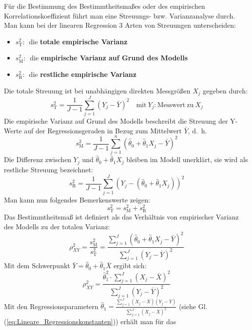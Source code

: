 F\"{u}r die Bestimmung des Bestimmtheitsma{\ss}es oder des
empirischen Korrelationskoeffizient f\"{u}hrt man eine Streuungs-
bzw. Varianzanalyse durch. Man kann bei der linearen Regression 3
Arten von Streuungen unterscheiden:
\begin{itemize}
	\item[] $s_{\mathrm{T}}^2:$~die \textbf{totale empirische Varianz}
	\item[] $s_{\mathrm{M}}^2:$~die \textbf{empirische Varianz auf Grund des Modells}
	\item[] $s_{\mathrm{R}}^2:$~die \textbf{restliche empirische Varianz}
\end{itemize}
Die totale Streuung ist bei unabhängigen direkten Messgrößen $X_j$ gegeben
durch:
\begin{equation}
s_{\mathrm{T}}^2 = \frac{1}{J - 1}\sum\limits_{j = 1}^J {(Y_j - \bar {Y})^2}
\quad \mathrm{mit~} Y_j : \mathrm{Messwert ~zu~}  X_j 
\end{equation}
Die empirische Varianz auf Grund des Modells beschreibt die
Streuung der Y-Werte auf der Regressionsgeraden in Bezug zum
Mittelwert $\bar{Y}$, d.~h.
\begin{equation}
s_{\mathrm{M}}^2 = \frac{1}{J - 1}\sum\limits_{j = 1}^n {(\hat{\theta}_0 + \hat{\theta}_1 X_j - \bar
	{Y})^2}
\end{equation}
Die Differenz zwischen $Y_j$ und $\hat{\theta}_0 + \hat{\theta}_1 X_j $ bleiben im
Modell unerkl\"{a}rt, sie wird als restliche Streuung bezeichnet:
\begin{equation}
s_{\mathrm{R}}^2 = \frac{1}{J - 1}\sum\limits_{j = 1}^J {(Y_j - (\hat{\theta}_0 
	+ \hat{\theta}_1 X_j))^2}
\end{equation}
Man kann nun folgendes Bemerkenswerte zeigen:
\begin{equation}
s_{\mathrm{T}}^2 = s_{\mathrm{M}}^2 + s_{\mathrm{R}}^2
\end{equation}
Das Bestimmtheitsma{\ss} ist definiert als das Verh\"{a}ltnis von
empirischer Varianz des Modells zu der totalen Varianz:
\[
\rho_{XY}^2 = \frac{s_{\mathrm{M}}^2}{s_{\mathrm{T}}^2} = \frac{\sum\limits_{j = 1}^J {(\hat{\theta}_0 + \hat{\theta}_1 X_j - \bar {Y})^2} }{\sum\limits_{j = 1}^J {(Y_j - \bar{Y})^2} }
\]
Mit dem Schwerpunkt $\bar {Y} = \hat{\theta}_0 + \hat{\theta}_1 \bar {X}$ ergibt sich:
\[
\rho_{XY}^2 = \frac{\hat{\theta}_1^2 \cdot \sum\limits_{j = 1}^J 
	{(X_j - \bar X)^2} }{\sum\limits_{j = 1}^J {(Y_j - \bar {Y})^2} }
\]
Mit den Regressionsparametern $\hat{\theta}_1 = \frac{\sum\limits_{j =
		1}^J {(X_j - \bar {X})(Y_j - \bar {Y})} }{\sum\limits_{j = 1}^J {(X_j
		- \bar {X})^2} }$ (siehe Gl.(\ref{eq:Lineare_Regressionskonstanten})) erhält man für das 

